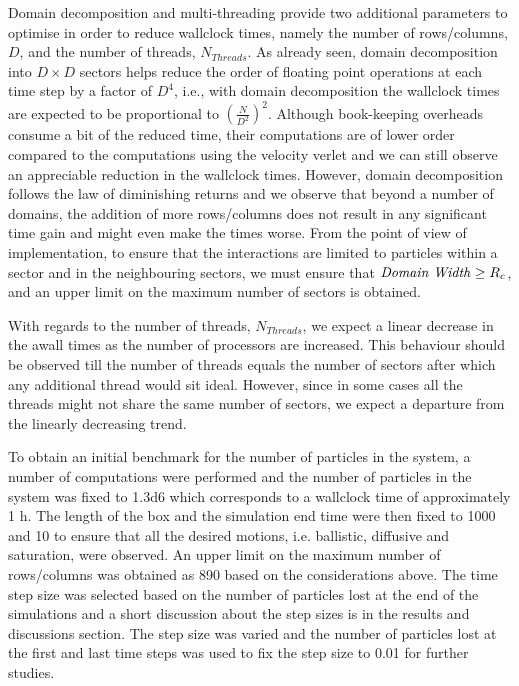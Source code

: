 \documentclass[11pt, oneside]{article}
\begin{document}
Domain decomposition and multi-threading provide two additional parameters to optimise in order to reduce wallclock times, namely the number of rows/columns, $D$, and the number of threads, $N_{Threads}$. As already seen, domain decomposition into $D \times D$ sectors helps reduce the order of floating point operations at each time step by a factor of $D^4$, i.e., with domain decomposition the wallclock times are expected to be proportional to $\left (\frac{N}{D^2} \right )^2$. Although book-keeping overheads consume a bit of the reduced time, their computations are of lower order compared to the computations using the velocity verlet and we can still observe an appreciable reduction in the wallclock times. However, domain decomposition follows the law of diminishing returns and we observe that beyond a number of domains, the addition of more rows/columns does not result in any significant time gain and might even make the times worse. From the point of view of implementation, to ensure that the interactions are limited to particles within a sector and in the neighbouring sectors, we must ensure that $\text{\textit{Domain Width}} \geq R_c$, and an upper limit on the maximum number of sectors is obtained.

With regards to the number of threads,  $N_{Threads}$, we expect a linear decrease in the awall times as the number of processors are increased. This behaviour should be observed till the number of threads equals the number of sectors after which any additional thread would sit ideal. However, since in some cases all the threads might not share the same number of sectors, we expect a departure from the linearly decreasing trend. 

To obtain an initial benchmark for the number of particles in the system, a number of computations were performed and the number of particles in the system was fixed to \num{1.3d6} which corresponds to a wallclock time of approximately \num{1} \si{\hour}. The length of the box and the simulation end time were then fixed to \num{1000} and \num{10} to ensure that all the desired motions, i.e. ballistic, diffusive and saturation, were observed. An upper limit on the maximum number of rows/columns was obtained as 890 based on the considerations above. The time step size was selected based on the number of particles lost at the end of the simulations and a short discussion about the step sizes is in the results and discussions section. The step size was varied and the number of particles lost at the first and last time steps was used to fix the step size to \num{0.01} for further studies.    
	
\end{document}
